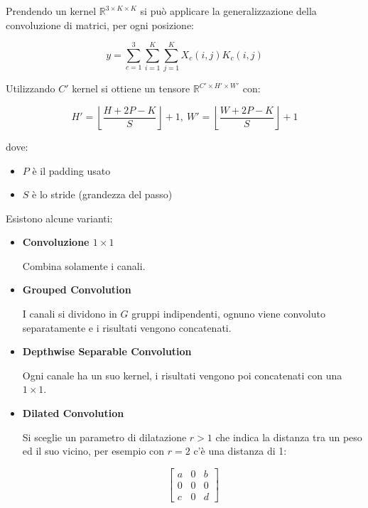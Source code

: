 \documentclass{article}
\begin{document}
Prendendo un kernel $\mathbb{R}^{3\times K\times K}$ si può applicare la generalizzazione della convoluzione di matrici, per ogni posizione:

\[
y=
\sum_{c=1}^{3}
\sum_{i=1}^{K}
\sum_{j=1}^{K}
X_c(i,j)K_c(i,j)
\]\newline

Utilizzando $C'$ kernel si ottiene un tensore  $\mathbb{R}^{C'\times H'\times W'}$ con:

\[
H'
=
\left\lfloor
\frac{H+2P-K}{S}
\right\rfloor+1,\
W'
=
\left\lfloor
\frac{W+2P-K}{S}
\right\rfloor+1
\]

\vspace{5pt}

dove:
\begin{itemize}
    \item $P$ è il padding usato
    \item $S$ è lo stride (grandezza del passo)\newline
\end{itemize}

Esistono alcune varianti:

\begin{itemize}

\item \textbf{Convoluzione $1\times1$}

    Combina solamente i canali.


\item \textbf{Grouped Convolution}

    I canali si dividono in $G$ gruppi indipendenti, ognuno viene convoluto separatamente e i risultati vengono concatenati.

\item \textbf{Depthwise Separable Convolution}

    Ogni canale ha un suo kernel, i risultati vengono poi concatenati con una $1\times1$.

\item \textbf{Dilated Convolution}

    Si sceglie un parametro di dilatazione $r>1$ che indica la distanza tra un peso ed il suo vicino, per esempio con $r=2$ c'è una distanza di 1:

    $$
    \begin{bmatrix}
        a & 0 & b\\
        0 & 0 & 0\\
        c & 0 & d
    \end{bmatrix}
    $$\newline

\end{itemize}
\end{document}
